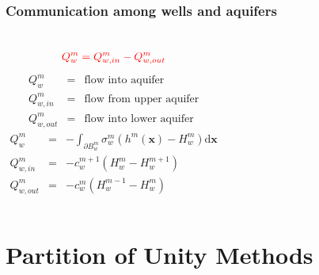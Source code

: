 \documentclass[10pt, xcolor=dvipsnames]{beamer} %
\newcommand{\figpath}{../graphics/}
\begin{document}
\begin{frame}
  \frametitle{Communication among wells and aquifers}
  \begin{columns}
        \begin{equation}
        \color{red}{ Q^m_w = Q^m_{w,in} - Q^m_{w,out} }
        \end{equation}
        \vspace{-10pt}
        \begin{eqnarray*}
            Q^m_w &=& \textrm{flow into aquifer} \nonumber\\
            Q^m_{w,in} &=& \textrm{flow from upper aquifer} \nonumber\\
            Q^m_{w,out} &=& \textrm{flow into lower aquifer} \nonumber
        \end{eqnarray*}
    \begin{eqnarray*}
      Q^m_w &=& -\int_{\partial{}B^m_w}\sigma^m_w \left( h^m(\mathbf{x})-H^m_w          \right) \mathrm{d}\mathbf{x} \\
      Q^m_{w,in} &=& -c^{m+1}_w \left( H^m_w-H^{m+1}_w \right) \\
      Q^m_{w,out} &=& -c^m_w \left( H^{m-1}_w-H^{m}_w \right) 
    \end{eqnarray*}
    \begin{center}
      \framebox{\color{red}{we are looking for $(h^m,H^m_w)$}}
    \end{center}
        \begin{figure}
        \vspace{-15pt}
        \begin{center} \label{fig:well}        
          \def\svgwidth{0.92\textwidth}
          
        \end{center}
    \end{figure}
    \end{columns}
\end{frame}


\section{Partition of Unity Methods}
\end{document}
